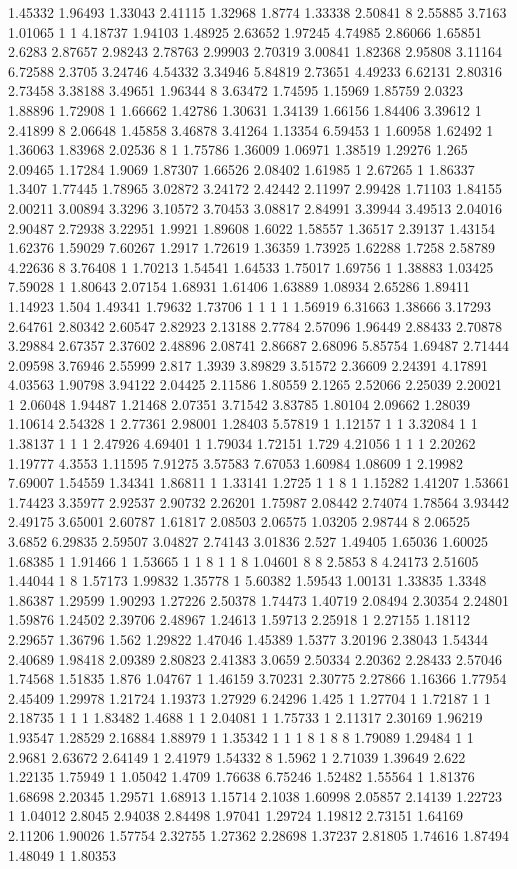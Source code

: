 1.45332 1.96493 1.33043 2.41115 1.32968 1.8774 1.33338 2.50841 8 2.55885 3.7163 1.01065 1 1 4.18737 1.94103 1.48925 2.63652 1.97245 4.74985 2.86066 1.65851 2.6283 2.87657 2.98243 2.78763 2.99903 2.70319 3.00841 1.82368 2.95808 3.11164 6.72588 2.3705 3.24746 4.54332 3.34946 5.84819 2.73651 4.49233 6.62131 2.80316 2.73458 3.38188 3.49651 1.96344 8 3.63472 1.74595 1.15969 1.85759 2.0323 1.88896 1.72908 1 1.66662 1.42786 1.30631 1.34139 1.66156 1.84406 3.39612 1 2.41899 8 2.06648 1.45858 3.46878 3.41264 1.13354 6.59453 1 1.60958 1.62492 1 1.36063 1.83968 2.02536 8 1 1.75786 1.36009 1.06971 1.38519 1.29276 1.265 2.09465 1.17284 1.9069 1.87307 1.66526 2.08402 1.61985 1 2.67265 1 1.86337 1.3407 1.77445 1.78965 3.02872 3.24172 2.42442 2.11997 2.99428 1.71103 1.84155 2.00211 3.00894 3.3296 3.10572 3.70453 3.08817 2.84991 3.39944 3.49513 2.04016 2.90487 2.72938 3.22951 1.9921 1.89608 1.6022 1.58557 1.36517 2.39137 1.43154 1.62376 1.59029 7.60267 1.2917 1.72619 1.36359 1.73925 1.62288 1.7258 2.58789 4.22636 8 3.76408 1 1.70213 1.54541 1.64533 1.75017 1.69756 1 1.38883 1.03425 7.59028 1 1.80643 2.07154 1.68931 1.61406 1.63889 1.08934 2.65286 1.89411 1.14923 1.504 1.49341 1.79632 1.73706 1 1 1 1 1.56919 6.31663 1.38666 3.17293 2.64761 2.80342 2.60547 2.82923 2.13188 2.7784 2.57096 1.96449 2.88433 2.70878 3.29884 2.67357 2.37602 2.48896 2.08741 2.86687 2.68096 5.85754 1.69487 2.71444 2.09598 3.76946 2.55999 2.817 1.3939 3.89829 3.51572 2.36609 2.24391 4.17891 4.03563 1.90798 3.94122 2.04425 2.11586 1.80559 2.1265 2.52066 2.25039 2.20021 1 2.06048 1.94487 1.21468 2.07351 3.71542 3.83785 1.80104 2.09662 1.28039 1.10614 2.54328 1 2.77361 2.98001 1.28403 5.57819 1 1.12157 1 1 3.32084 1 1 1.38137 1 1 1 2.47926 4.69401 1 1.79034 1.72151 1.729 4.21056 1 1 1 2.20262 1.19777 4.3553 1.11595 7.91275 3.57583 7.67053 1.60984 1.08609 1 2.19982 7.69007 1.54559 1.34341 1.86811 1 1.33141 1.2725 1 1 8 1 1.15282 1.41207 1.53661 1.74423 3.35977 2.92537 2.90732 2.26201 1.75987 2.08442 2.74074 1.78564 3.93442 2.49175 3.65001 2.60787 1.61817 2.08503 2.06575 1.03205 2.98744 8 2.06525 3.6852 6.29835 2.59507 3.04827 2.74143 3.01836 2.527 1.49405 1.65036 1.60025 1.68385 1 1.91466 1 1.53665 1 1 8 1 1 8 1.04601 8 8 2.5853 8 4.24173 2.51605 1.44044 1 8 1.57173 1.99832 1.35778 1 5.60382 1.59543 1.00131 1.33835 1.3348 1.86387 1.29599 1.90293 1.27226 2.50378 1.74473 1.40719 2.08494 2.30354 2.24801 1.59876 1.24502 2.39706 2.48967 1.24613 1.59713 2.25918 1 2.27155 1.18112 2.29657 1.36796 1.562 1.29822 1.47046 1.45389 1.5377 3.20196 2.38043 1.54344 2.40689 1.98418 2.09389 2.80823 2.41383 3.0659 2.50334 2.20362 2.28433 2.57046 1.74568 1.51835 1.876 1.04767 1 1.46159 3.70231 2.30775 2.27866 1.16366 1.77954 2.45409 1.29978 1.21724 1.19373 1.27929 6.24296 1.425 1 1.27704 1 1.72187 1 1 2.18735 1 1 1 1.83482 1.4688 1 1 2.04081 1 1.75733 1 2.11317 2.30169 1.96219 1.93547 1.28529 2.16884 1.88979 1 1.35342 1 1 1 8 1 8 8 1.79089 1.29484 1 1 2.9681 2.63672 2.64149 1 2.41979 1.54332 8 1.5962 1 2.71039 1.39649 2.622 1.22135 1.75949 1 1.05042 1.4709 1.76638 6.75246 1.52482 1.55564 1 1.81376 1.68698 2.20345 1.29571 1.68913 1.15714 2.1038 1.60998 2.05857 2.14139 1.22723 1 1.04012 2.8045 2.94038 2.84498 1.97041 1.29724 1.19812 2.73151 1.64169 2.11206 1.90026 1.57754 2.32755 1.27362 2.28698 1.37237 2.81805 1.74616 1.87494 1.48049 1 1.80353 